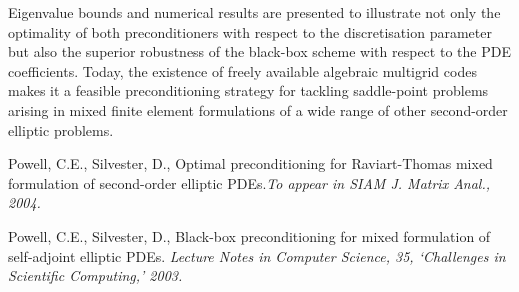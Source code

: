 \documentclass{report}
\begin{document}
Eigenvalue bounds and numerical results are presented to illustrate not
only the optimality of both preconditioners with respect to the
discretisation parameter but also the superior robustness of the
black-box scheme with respect to the PDE coefficients. Today, the
existence of freely available algebraic multigrid codes makes it a
feasible preconditioning strategy for tackling saddle-point problems
arising in mixed finite element formulations of a wide range of other
second-order elliptic problems.

\begin{thebibliography}{10}
 Powell, C.E., Silvester, D., Optimal preconditioning for
Raviart-Thomas mixed formulation of second-order elliptic PDEs.\textit{To
appear in SIAM J. Matrix Anal., 2004.}

Powell, C.E., Silvester, D., Black-box preconditioning for
mixed formulation of self-adjoint elliptic PDEs. \textit{Lecture Notes in
Computer Science, 35, `Challenges in Scientific Computing,' 2003.}
\end{thebibliography}
\end{document}
